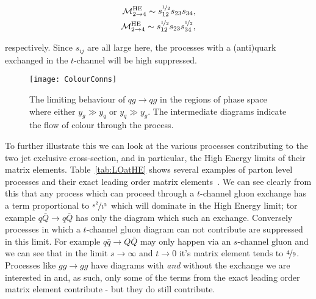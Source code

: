	\begin{align}
	\begin{split}
		\mathcal{M}^{\text{HE}}_{2\to 4} \sim s_{12}^{\nicefrac{1}{2}}s_{23}s_{34},\\
		\mathcal{M}^{\text{HE}}_{2\to 4} \sim s_{12}^{\nicefrac{1}{2}}s_{23}s_{34}^{\nicefrac{1}{2}},
	\end{split}
	\end{align}

	respectively.  Since $s_{ij}$ are all large here, the processes with a (anti)quark exchanged
	in the $t$-channel will be high suppressed.

	\begin{figure}
		\begin{center}
		\texttt{[image: ColourConns]}
		\caption{The limiting behaviour of $qg\to qg$ in the regions of phase space where
		either $y_g\gg y_q$ or $y_q\gg y_g$.  The intermediate diagrams indicate the flow
		of colour through the process.}
		\label{fig:colorConns}
		\end{center}
	\end{figure}

	To further illustrate this we can look at the various processes contributing to the two
	jet exclusive cross-section, and in particular, the High Energy limits of their matrix
	elements.  Table~\ref{tab:LOatHE} shows several examples of parton level processes and
	their exact leading order matrix elements~\cite{pinkBook}.  We can see clearly from this
	that any process which can proceed through a $t$-channel gluon exchange has a term
	proportional to $\nicefrac{s^2}{t^2}$ which will dominate in the High Energy limit; tor
	example $q\bar{Q}\to q\bar{Q}$ has only the diagram which such an exchange.
	Conversely processes in which a $t$-channel gluon diagram can not contribute are
	suppressed in this limit.  For example $q\bar{q}\to Q\bar{Q}$ may only happen via an
	$s$-channel gluon and we can see that in the limit $s\to\infty$ and $t\to0$ it's matrix
	element tends to $\nicefrac{4}{9}$.  Processes like $gg\to gg$ have diagrams with \emph{and}
	without the exchange we are interested in and, as such, only some of the terms from the exact
	leading order matrix element contribute - but they do still contribute.

